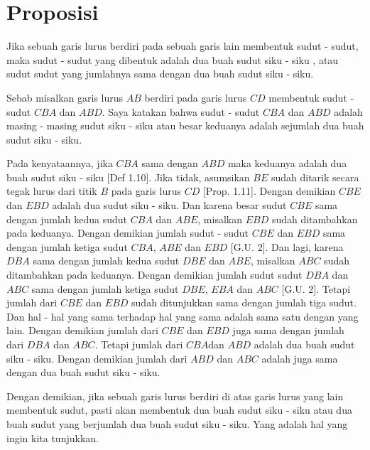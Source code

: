 \documentclass[a4paper]{book}
\begin{document}
\section*{\centering Proposisi \thesection} 
Jika sebuah garis lurus berdiri pada sebuah garis lain membentuk sudut - sudut, maka
sudut - sudut yang dibentuk adalah dua buah sudut siku - siku , atau sudut sudut yang
jumlahnya sama dengan dua buah sudut siku - siku.
\begin{center}
\end{center}

Sebab misalkan garis lurus $AB$ berdiri pada garis lurus $CD$ membentuk 
sudut - sudut $CBA$ dan $ABD$. Saya katakan bahwa sudut - sudut $CBA$ dan
$ABD$ adalah masing - masing sudut siku - siku atau besar keduanya adalah 
sejumlah dua buah sudut siku - siku.

Pada kenyataannya, jika $CBA$ sama dengan $ABD$ maka keduanya adalah dua buah 
sudut siku - siku [Def 1.10]. Jika tidak, asumsikan $BE$ sudah ditarik secara
tegak lurus dari titik $B$ pada garis lurus $CD$ [Prop. 1.11]. Dengan demikian
$CBE$ dan $EBD$ adalah dua sudut siku - siku. Dan karena besar sudut $CBE$ sama 
dengan jumlah kedua sudut $CBA$ dan $ABE$, misalkan $EBD$ sudah ditambahkan pada 
keduanya. Dengan demikian jumlah sudut - sudut $CBE$ dan $EBD$ sama dengan
jumlah ketiga sudut $CBA$, $ABE$ dan $EBD$ [G.U. 2]. Dan lagi, karena $DBA$
sama dengan jumlah kedua sudut $DBE$ dan $ABE$, misalkan $ABC$ sudah 
ditambahkan pada keduanya. Dengan demikian jumlah sudut sudut $DBA$  dan $ABC$
sama dengan jumlah ketiga sudut $DBE$, $EBA$ dan $ABC$ [G.U. 2]. Tetapi jumlah
dari $CBE$ dan $EBD$ sudah ditunjukkan sama dengan jumlah tiga sudut. Dan hal -
hal yang sama terhadap hal yang sama adalah sama satu dengan yang lain. Dengan
demikian jumlah dari $CBE$ dan $EBD$ juga sama dengan jumlah dari $DBA$ dan 
$ABC$. Tetapi jumlah dari $CBA$dan $ABD$ adalah dua buah sudut siku - siku. 
Dengan demikian jumlah dari $ABD$ dan $ABC$ adalah juga sama dengan dua buah
sudut siku - siku.

Dengan demikian, jika sebuah garis lurus berdiri di atas garis lurus yang lain
membentuk sudut, pasti akan membentuk dua buah sudut siku - siku atau dua buah
sudut yang berjumlah dua buah sudut siku - siku. Yang adalah hal yang ingin
kita tunjukkan.
\end{document}
